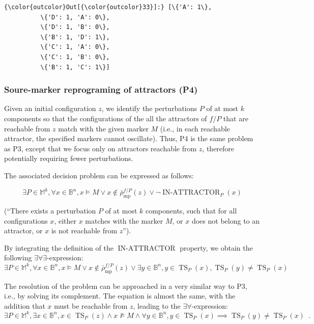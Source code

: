 \documentclass[PCJ,Unicode,screen,mode=plain]{cedram}
\begin{document}
\begin{small}
\begin{Verbatim}[commandchars=\\\{\}]
{\color{outcolor}Out[{\color{outcolor}33}]:} [\{'A': 1\},
          \{'D': 1, 'A': 0\},
          \{'D': 1, 'B': 0\},
          \{'B': 1, 'D': 1\},
          \{'C': 1, 'A': 0\},
          \{'C': 1, 'B': 0\},
          \{'B': 1, 'C': 1\}]
\end{Verbatim}
\end{small}
\hypertarget{soure-marker-reprograming-of-attractors-p4}{%
\subsubsection{Soure-marker reprograming of attractors
(P4)}\label{soure-marker-reprograming-of-attractors-p4}}

Given an initial configuration \(z\), we identify the perturbations
\(P\) of at most \(k\) components so that the configurations of the all
the attractors of \(f/P\) that are reachable from \(z\) match with the
given marker \(M\) (i.e., in each reachable attractor, the specified
markers cannot oscillate). Thus, P4 is the same problem as P3, except
that we focus only on attractors reachable from \(z\), therefore
potentially requiring fewer perturbations.

The associated decision problem can be expressed as follows:

\begin{equation}
\exists P\in\mathbb M^k, \forall x\in\mathbb B^n, x\models M \vee x\notin\bar\rho^{f/P}_{\mathrm{mp}}(z)  \vee \neg\operatorname{IN-ATTRACTOR}_P(x)
\end{equation}

(``There exists a perturbation \(P\) of at most \(k\) components, such
that for all configurations \(x\), either \(x\) matches with the marker
\(M\), or \(x\) does not belong to an attractor, or \(x\) is not
reachable from \(z\)'').

By integrating the definition of the \(\operatorname{IN-ATTRACTOR}\)
property, we obtain the following \(\exists\forall\exists\)-expression:
\begin{equation}
\exists P\in\mathbb M^k, \forall x\in\mathbb B^n, x\models M \vee x\notin\bar\rho^{f/P}_{\mathrm{mp}}(z) \vee \exists y\in\mathbb B^n,
   y\in \operatorname{TS}_P(x), \operatorname{TS}_P(y) \neq \operatorname{TS}_P(x)
\end{equation}

The resolution of the problem can be approached in a very similar way to
P3, i.e., by solving its complement. The equation is almost the same,
with the addition that \(x\) must be reachable from \(z\), leading to
the \(\exists\forall\)-expression: \begin{equation}
\exists P\in\mathbb M^k, \exists x\in\mathbb B^n, x\in\operatorname{TS}_P(z) \wedge x\not\models M\wedge \forall y\in\mathbb B^n, y\in \operatorname{TS}_P(x) \implies \operatorname{TS}_P(y) \neq \operatorname{TS}_P(x)
\enspace.
\end{equation}
\end{document}
